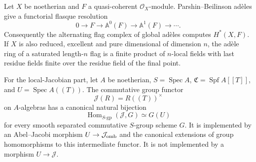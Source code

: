 \begin{theorem}\label{thm:B3-adeles}
Let $X$ be noetherian and $F$ a quasi-coherent $\mathcal O_X$-module.
Parshin--Beilinson ad\`eles give a functorial flasque resolution
\[
 0\longrightarrow F\longrightarrow\mathbb A^0(F)
 \longrightarrow\mathbb A^1(F)\longrightarrow\cdots.
\]
Consequently the alternating flag complex of global ad\`eles computes
$H^*(X,F)$. If $X$ is also reduced, excellent and pure dimensional of
dimension $n$, the ad\`ele ring of a saturated length-$n$ flag is a
finite product of $n$-local fields with last residue fields finite over
the residue field of the final point.

For the local-Jacobian part, let $A$ be noetherian,
$S=\operatorname{Spec}A$, $\mathfrak C=\operatorname{Spf}A[[T]]$,
and $U=\operatorname{Spec}A((T))$. The commutative group functor
\[
 \mathcal J(R)=R((T))^\times
\]
on $A$-algebras has a canonical natural bijection
\[
 \operatorname{Hom}_{S\text{-}\mathrm{gp}}(\mathcal J,G)
 \simeq G(U)
\]
for every smooth separated commutative $S$-group scheme $G$.
It is implemented by an Abel--Jacobi morphism
$U\to\mathcal J_{\rm omb}$ and the canonical extensions of group
homomorphisms to this intermediate functor. It is not implemented by
a morphism $U\to\mathcal J$.
\end{theorem}
